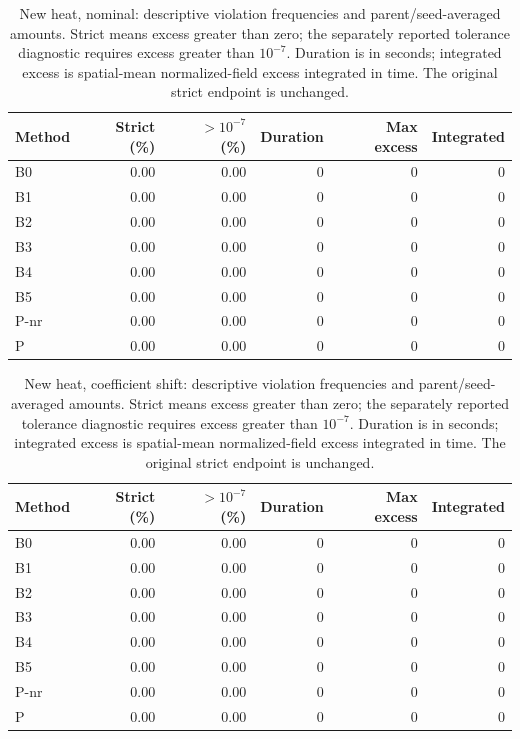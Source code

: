 \begin{table}[ht]
\centering\small
\caption{New heat, nominal: descriptive violation frequencies and parent/seed-averaged amounts. Strict means excess greater than zero; the separately reported tolerance diagnostic requires excess greater than $10^{-7}$. Duration is in seconds; integrated excess is spatial-mean normalized-field excess integrated in time. The original strict endpoint is unchanged.}\label{tab:new_heat_constraints_locked_nominal}
\begin{tabular}{@{}lrrrrr@{}}\toprule
Method & Strict (\%) & $>10^{-7}$ (\%) & Duration & Max excess & Integrated\\\midrule
B0 & 0.00 & 0.00 & 0 & 0 & 0\\
B1 & 0.00 & 0.00 & 0 & 0 & 0\\
B2 & 0.00 & 0.00 & 0 & 0 & 0\\
B3 & 0.00 & 0.00 & 0 & 0 & 0\\
B4 & 0.00 & 0.00 & 0 & 0 & 0\\
B5 & 0.00 & 0.00 & 0 & 0 & 0\\
P-nr & 0.00 & 0.00 & 0 & 0 & 0\\
P & 0.00 & 0.00 & 0 & 0 & 0\\
\bottomrule\end{tabular}
\end{table}

\begin{table}[ht]
\centering\small
\caption{New heat, coefficient shift: descriptive violation frequencies and parent/seed-averaged amounts. Strict means excess greater than zero; the separately reported tolerance diagnostic requires excess greater than $10^{-7}$. Duration is in seconds; integrated excess is spatial-mean normalized-field excess integrated in time. The original strict endpoint is unchanged.}\label{tab:new_heat_constraints_locked_coefficient_ood}
\begin{tabular}{@{}lrrrrr@{}}\toprule
Method & Strict (\%) & $>10^{-7}$ (\%) & Duration & Max excess & Integrated\\\midrule
B0 & 0.00 & 0.00 & 0 & 0 & 0\\
B1 & 0.00 & 0.00 & 0 & 0 & 0\\
B2 & 0.00 & 0.00 & 0 & 0 & 0\\
B3 & 0.00 & 0.00 & 0 & 0 & 0\\
B4 & 0.00 & 0.00 & 0 & 0 & 0\\
B5 & 0.00 & 0.00 & 0 & 0 & 0\\
P-nr & 0.00 & 0.00 & 0 & 0 & 0\\
P & 0.00 & 0.00 & 0 & 0 & 0\\
\bottomrule\end{tabular}
\end{table}

